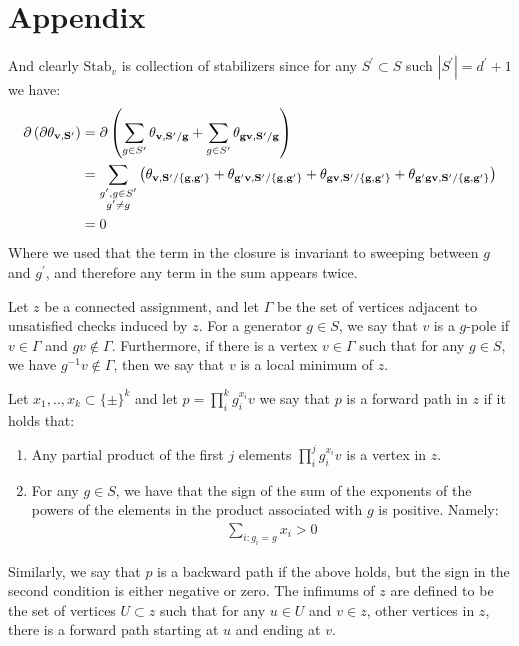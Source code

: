 \section{Appendix}


 And clearly $\text{Stab}_{v}$ is collection of stabilizers since for any $S^{\prime} \subset S$ such $|S^{\prime}|=d^{\prime}+1$ we have:
  \begin{equation*}
    \begin{split}
      \partial \left(   \partial \mathbf{\theta_{v ,S^{\prime}}{} }{} \right) & = \partial \left( \sum_{g \in S^{\prime}} \mathbf{\theta_{v ,S^{\prime}/g} } + \sum_{g \in S^{\prime}} \mathbf{\theta_{gv ,S^{\prime}/g} }  \right) \\
      & = \sum_{ \substack{ g^{\prime},g \in S^{\prime} \\ g^{\prime}\neq g } } \left( \mathbf{\theta_{v ,S^{\prime}/\{ g,g^{\prime} \} } } +   \mathbf{\theta_{g^{\prime}v ,S^{\prime}/\{ g,g^{\prime} \} } }+ \mathbf{\theta_{gv ,S^{\prime}/\{ g,g^{\prime} \} } } + \mathbf{\theta_{g^{\prime}gv ,S^{\prime}/\{ g, g^{\prime}\}} } \right) \\
      & = 0
    \end{split}
  \end{equation*}
Where we used that the term in the closure is invariant to sweeping between $g$ and $g^\prime$, and therefore any term in the sum appears twice.


\begin{definition}
Let $z$ be a connected assignment, and let $\Gamma$ be the set of vertices adjacent to unsatisfied checks induced by $z$. For a generator $g \in S$, we say that $v$ is a $g$-pole if $v \in \Gamma$ and $gv \notin \Gamma$. Furthermore, if there is a vertex $v \in \Gamma$ such that for any $g \in S$, we have $g^{-1}v \notin \Gamma$, then we say that $v$ is a local minimum of $z$. 

Let $x_{1},..,x_{k} \subset \{\pm \}^{k}$ and let $p = \prod_{i}^{k}g_{i}^{x_{i}}v$ we say that $p$ is a forward path in $z$ if  it holds that: 
\begin{enumerate}
  \item Any partial product of the first $j$ elements $\prod_{i}^{j}g_{i}^{x_{i}}v$ is a vertex in $z$. 
  \item
For any $g \in S$, we have that the sign of the sum of the exponents of the powers of the elements in the product associated with $g$ is positive. Namely:
    \begin{equation*}
      \begin{split}
        \sum_{i : g_{i} = g}x_{i} > 0
      \end{split}
    \end{equation*}
\end{enumerate}
Similarly, we say that $p$ is a backward path if the above holds, but the sign in the second condition is either negative or zero. The infimums of $z$ are defined to be the set of vertices $U \subset z$ such that for any $u \in U$ and $v \in z$, other vertices in $z$, there is a forward path starting at $u$ and ending at $v$.
\end{definition}
